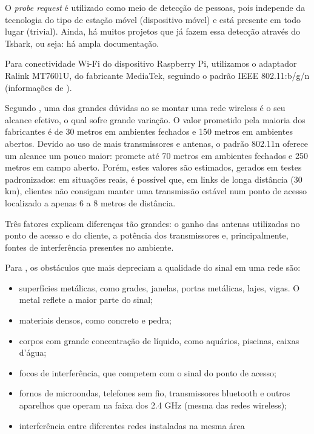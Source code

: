 O \emph{probe request} é utilizado como meio de detecção de pessoas, pois
independe da tecnologia do tipo de estação móvel (dispositivo móvel) e está presente em todo lugar (trivial). Ainda, há muitos projetos que já fazem essa detecção através do Tshark, ou seja: há ampla documentação.

Para conectividade Wi-Fi do dispositivo Raspberry Pi, utilizamos o adaptador Ralink MT7601U, do fabricante MediaTek, seguindo o padrão IEEE 802.11:b/g/n (informações de ).

Segundo , uma das grandes dúvidas ao se montar uma rede wireless é o seu alcance efetivo, o qual sofre grande variação. O valor prometido pela maioria dos fabricantes é de 30 metros em ambientes fechados e 150 metros em ambientes abertos. Devido ao uso de mais transmissores e antenas, o padrão 802.11n oferece um alcance um pouco maior: promete até 70 metros em ambientes fechados e 250 metros em campo aberto. Porém, estes valores são estimados, gerados em testes padronizados: em situações reais, é possível que, em links de longa distância (30 km), clientes não consigam manter uma transmissão estável num ponto de acesso localizado a apenas 6 a 8 metros de distância.

Três fatores explicam diferenças tão grandes: o ganho das antenas utilizadas no ponto de acesso e do cliente, a potência dos transmissores e, principalmente, fontes de interferência presentes no ambiente.

Para , os obstáculos que mais depreciam a qualidade do sinal em uma rede são:

\begin{itemize}
  \item superfícies metálicas, como grades, janelas, portas metálicas, lajes, vigas. O metal reflete a maior parte do sinal;
  \item materiais densos, como concreto e pedra;
  \item corpos com grande concentração de líquido, como aquários, piscinas, caixas d'água;
	\item focos de interferência, que competem com o sinal do ponto de acesso;
	\item fornos de microondas, telefones sem fio, transmissores bluetooth e outros aparelhos que operam na faixa dos 2.4 GHz (mesma das redes wireless);
  \item interferência entre diferentes redes instaladas na mesma área
\end{itemize}

